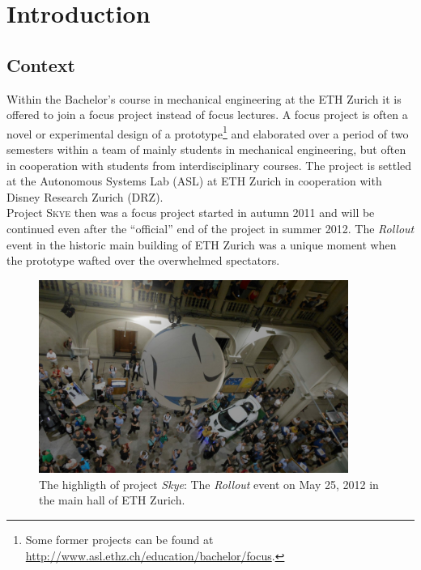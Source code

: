 \chapter{Introduction}\label{sec:introduction}
\graphicspath{{graphics/}{graphics/systems/}}


\section{Context}
\label{sec:context}

Within the Bachelor's course in mechanical engineering at the ETH Zurich it is offered to join a focus project instead of focus lectures. A focus project is often a novel or experimental design of a prototype\footnote{Some former projects can be found at \url{http://www.asl.ethz.ch/education/bachelor/focus}.} and elaborated over a period of two semesters within a team of mainly students in mechanical engineering, but often in cooperation with students from interdisciplinary courses. The project is settled at the Autonomous Systems Lab (ASL) at ETH Zurich in cooperation with Disney Research Zurich (DRZ). \\
Project \textsc{Skye} then was a focus project started in autumn \num{2011} and will be continued even after the ``official'' end of the project in summer 2012. The \textit{Rollout} event in the historic main building of ETH Zurich was a unique moment when the prototype wafted over the overwhelmed spectators. \\

\begin{figure}[H]
	\centering
    \includegraphics[width = 0.9\textwidth]{graphics/rollout2.jpg}
  \caption{The highligth of project \textit{Skye}: The \textit{Rollout} event on May 25, 2012 in the main hall of ETH Zurich.}
  \label{fig:rollout}
\end{figure}


